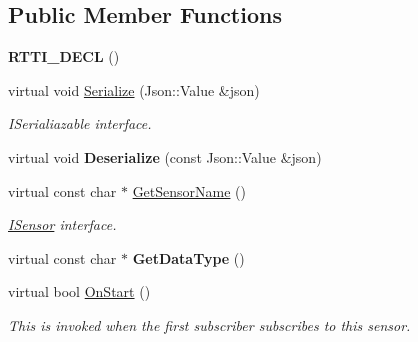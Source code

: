 \subsection*{Public Member Functions}
\begin{DoxyCompactItemize}
\item 
\mbox{\label{class_gesture_sensor_a2262485356c60a9d0bf5e6ffdcbe3a4c}} 
{\bfseries R\+T\+T\+I\+\_\+\+D\+E\+CL} ()
\item 
\mbox{\label{class_gesture_sensor_ae69a58945c1572e0aac47a75a0fe4b7e}} 
virtual void \hyperlink{class_gesture_sensor_ae69a58945c1572e0aac47a75a0fe4b7e}{Serialize} (Json\+::\+Value \&json)
\begin{DoxyCompactList}\small\item\em I\+Serialiazable interface. \end{DoxyCompactList}\item 
\mbox{\label{class_gesture_sensor_a6e07179b4b799de3dea6234cde01ab3e}} 
virtual void {\bfseries Deserialize} (const Json\+::\+Value \&json)
\item 
\mbox{\label{class_gesture_sensor_ae62b4d22b9e8a116e92190d2d8dfe2ea}} 
virtual const char $\ast$ \hyperlink{class_gesture_sensor_ae62b4d22b9e8a116e92190d2d8dfe2ea}{Get\+Sensor\+Name} ()
\begin{DoxyCompactList}\small\item\em \hyperlink{class_i_sensor}{I\+Sensor} interface. \end{DoxyCompactList}\item 
\mbox{\label{class_gesture_sensor_a77ec8b522049505ce9f5072a59bf1c62}} 
virtual const char $\ast$ {\bfseries Get\+Data\+Type} ()
\item 
\mbox{\label{class_gesture_sensor_a4743a42260f8aeb0b71ef6d85eb3b343}} 
virtual bool \hyperlink{class_gesture_sensor_a4743a42260f8aeb0b71ef6d85eb3b343}{On\+Start} ()
\begin{DoxyCompactList}\small\item\em This is invoked when the first subscriber subscribes to this sensor. \end{DoxyCompactList}\item 

\end{DoxyCompactItemize}
